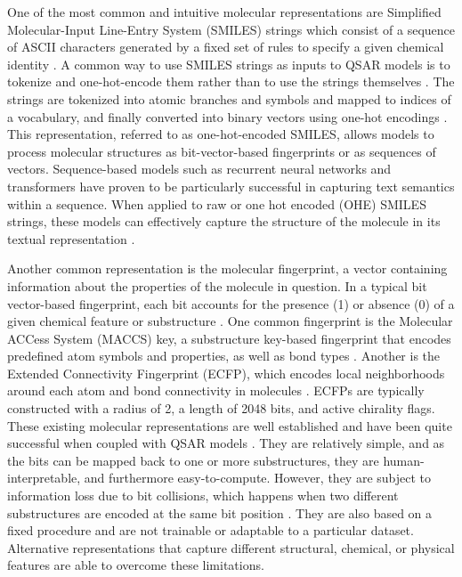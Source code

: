 One of the most common and intuitive molecular representations are Simplified Molecular-Input Line-Entry System (SMILES) strings which consist of a sequence of ASCII characters generated by a fixed set of rules to specify a given chemical identity \citep{Weininger1988}. A common way to use SMILES strings as inputs to QSAR models is to tokenize and one-hot-encode them rather than to use the strings themselves \citep{TeachOpenCADD2023}. The strings are tokenized into atomic branches and symbols and mapped to indices of a vocabulary, and finally converted into binary vectors using one-hot encodings \citep{TeachOpenCADD2023}. This representation, referred to as one-hot-encoded SMILES, allows models to process molecular structures as bit-vector-based fingerprints or as sequences of vectors. Sequence-based models such as recurrent neural networks and transformers have proven to be particularly successful in capturing text semantics within a sequence. When applied to raw or one hot encoded (OHE) SMILES strings, these models can effectively capture the structure of the molecule in its textual representation \citep{TeachOpenCADD2023}. 

Another common representation is the molecular fingerprint, a vector containing information about the properties of the molecule in question. In a typical bit vector-based fingerprint, each bit accounts for the presence (1) or absence (0) of a given chemical feature or substructure \citep{Fassio2022}. One common fingerprint is the Molecular ACCess System (MACCS) key, a substructure key-based fingerprint that encodes predefined atom symbols and properties, as well as bond types \citep{Xie2020}. Another is the Extended Connectivity Fingerprint (ECFP), which encodes local neighborhoods around each atom and bond connectivity in molecules \citep{Xie2020}. ECFPs are typically constructed with a radius of 2, a length of 2048 bits, and active chirality flags. These existing molecular representations are well established and have been quite successful when coupled with QSAR models \citep{CortsCiriano2020, Sabando2021}. They are relatively simple, and as the bits can be mapped back to one or more substructures, they are human-interpretable, and furthermore easy-to-compute. However, they are subject to information loss due to bit collisions, which happens when two different substructures are encoded at the same bit position \citep{Fassio2022}. They are also based on a fixed procedure and are not trainable or adaptable to a particular dataset. Alternative representations that capture different structural, chemical, or physical features are able to overcome these limitations. 

